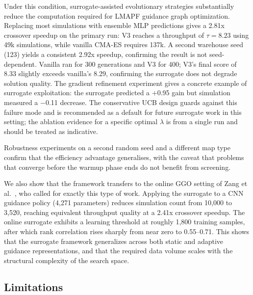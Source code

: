 \documentclass[conference]{IEEEtran}
\begin{document}
Under this condition, surrogate-assisted evolutionary strategies
substantially reduce the computation required for LMAPF guidance graph
optimization. Replacing most simulations with ensemble MLP predictions
gives a 2.81x crossover speedup on the primary run: V3 reaches a
throughput of $\tau = 8.23$ using 49k simulations, while vanilla CMA-ES
requires 137k. A second warehouse seed (123) yields a consistent 2.92x
speedup, confirming the result is not seed-dependent. Vanilla ran for 300
generations and V3 for 400; V3's final score of 8.33 slightly exceeds
vanilla's 8.29, confirming the surrogate does not degrade solution quality.
The gradient refinement experiment gives a concrete example of surrogate
exploitation: the surrogate predicted a $+$0.95 gain but simulation
measured a $-$0.11 decrease. The conservative UCB design guards against
this failure mode and is recommended as a default for future surrogate
work in this setting; the ablation evidence for a specific optimal
$\lambda$ is from a single run and should be treated as indicative.

Robustness experiments on a second random seed and a different map type
confirm that the efficiency advantage generalises, with the caveat that
problems that converge before the warmup phase ends do not benefit from
screening.

We also show that the framework transfers to the online GGO setting of
Zang et al.~\cite{zang2025}, who called for exactly this type of work.
Applying the surrogate to a CNN guidance policy (4,271 parameters) reduces
simulation count from 10,000 to 3,520, reaching equivalent throughput
quality at a 2.41x crossover speedup. The online surrogate exhibits a
learning threshold at roughly 1,800 training samples, after which rank
correlation rises sharply from near zero to 0.55--0.71. This shows that
the surrogate framework generalizes across both static and adaptive
guidance representations, and that the required data volume scales with
the structural complexity of the search space.

\subsection{Limitations}
\end{document}
